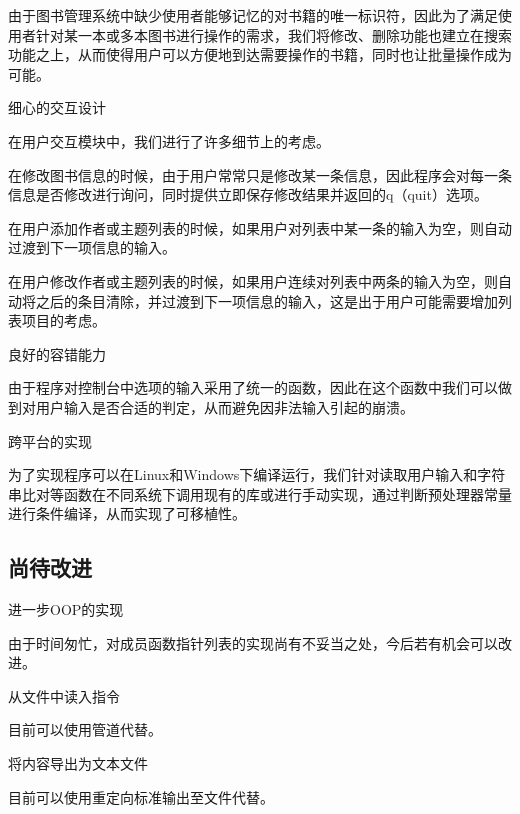 \begin{DoxyEnumerate}
由于图书管理系统中缺少使用者能够记忆的对书籍的唯一标识符，因此为了满足使用者针对某一本或多本图书进行操作的需求，我们将修改、删除功能也建立在搜索功能之上，从而使得用户可以方便地到达需要操作的书籍，同时也让批量操作成为可能。
\item 细心的交互设计

在用户交互模块中，我们进行了许多细节上的考虑。
\begin{DoxyItemize}
\item 在修改图书信息的时候，由于用户常常只是修改某一条信息，因此程序会对每一条信息是否修改进行询问，同时提供立即保存修改结果并返回的{\ttfamily q}（quit）选项。
\item 在用户添加作者或主题列表的时候，如果用户对列表中某一条的输入为空，则自动过渡到下一项信息的输入。
\item 在用户修改作者或主题列表的时候，如果用户连续对列表中两条的输入为空，则自动将之后的条目清除，并过渡到下一项信息的输入，这是出于用户可能需要增加列表项目的考虑。
\end{DoxyItemize}
\item 良好的容错能力

由于程序对控制台中选项的输入采用了统一的函数，因此在这个函数中我们可以做到对用户输入是否合适的判定，从而避免因非法输入引起的崩溃。
\item 跨平台的实现

为了实现程序可以在{\ttfamily Linux}和{\ttfamily Windows}下编译运行，我们针对读取用户输入和字符串比对等函数在不同系统下调用现有的库或进行手动实现，通过判断预处理器常量进行条件编译，从而实现了可移植性。
\end{DoxyEnumerate}

\subsection*{尚待改进}


\begin{DoxyEnumerate}
\item 进一步{\ttfamily O\-O\-P}的实现

由于时间匆忙，对成员函数指针列表的实现尚有不妥当之处，今后若有机会可以改进。
\item 从文件中读入指令

目前可以使用管道代替。
\item 将内容导出为文本文件

目前可以使用重定向标准输出至文件代替。 
\end{DoxyEnumerate}